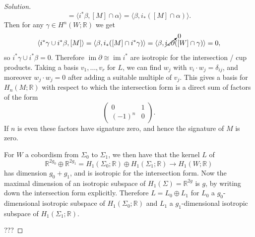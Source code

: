 \documentclass{article}
\theoremstyle{definition}
\DeclareMathOperator{\im}{im}
\newcommand{\R}{\mathbb{R}}
\begin{document}
\begin{enumerate}
\begin{proof}[Solution]
\begin{equation*}
                    = \langle i^*\beta,[M]\cap\alpha\rangle
                    = \langle\beta,i_*([M]\cap\alpha)\rangle.
            \end{equation*}
            Then for any $\gamma\in H^n(W;\R)$ we get
            \begin{equation*}
                \langle i^*\gamma\cup i^*\beta,[M]\rangle
                    = \langle\beta,i_*([M]\cap i^*\gamma)\rangle
                    = \langle\beta,
                        \cancelto{0}{i_*\partial}([W]\cap\gamma)\rangle
                    = 0,
            \end{equation*}
            so $i^*\gamma\cup i^*\beta=0$. Therefore $\im\partial\cong\im i^*$
            are isotropic for the intersection / cup products. Taking a basis
            $v_1,\ldots,v_r$ for $L$, we can find $w_j$ with
            $v_i\cdot w_j=\delta_{ij}$, and moreover $w_j\cdot w_j=0$ after
            adding a suitable multiple of $v_j$. This gives a basis for
            $H_n(M;\R)$ with respect to which the intersection form is a direct
            sum of factors of the form
            \begin{equation*}
                \begin{pmatrix}
                    0 & 1 \\ (-1)^n & 0
                \end{pmatrix}.
            \end{equation*}
            If $n$ is even these factors have signature zero, and hence the
            signature of $M$ is zero.

            For $W$ a cobordism from $\Sigma_0$ to $\Sigma_1$, we then have that
            the kernel $L$ of
            \begin{equation*}
                \R^{2g_0}\oplus\R^{2g_1}
                    = H_1(\Sigma_0;\R)\oplus H_1(\Sigma_1;\R)\to H_1(W;\R)
            \end{equation*}
            has dimension $g_0+g_1$, and is isotropic for the intersection form.
            Now the maximal dimension of an isotropic subspace of
            $H_1(\Sigma)=\R^{2g}$ is $g$, by writing down the intersection form
            explicitly. Therefore $L=L_0\oplus L_1$ for $L_0$ a
            $g_0$-dimensional isotropic subspace of $H_1(\Sigma_0;\R)$ and $L_1$
            a $g_1$-dimensional isotropic subspace of $H_1(\Sigma_1;\R)$.

            ???
        \end{proof}


\end{enumerate}
\end{document}
